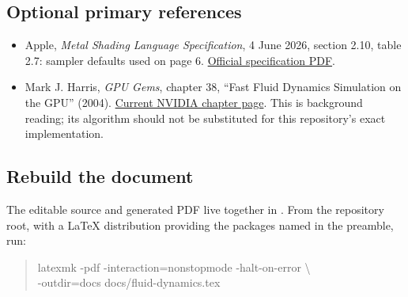 \documentclass[11pt,a4paper]{article}
\begin{document}
\subsection*{Optional primary references}
\begin{itemize}
\item Apple, \emph{Metal Shading Language Specification}, 4 June 2026,
section 2.10, table 2.7: sampler defaults used on page 6.
\href{https://developer.apple.com/metal/Metal-Shading-Language-Specification.pdf}{Official specification PDF}.
\item Mark J. Harris, \emph{GPU Gems}, chapter 38, ``Fast Fluid Dynamics
Simulation on the GPU'' (2004).
\href{https://developer.nvidia.com/gpugems/gpugems/part-vi-beyond-triangles/chapter-38-fast-fluid-dynamics-simulation-gpu}{Current NVIDIA chapter page}.
This is background reading; its algorithm should not be substituted for this
repository's exact implementation.
\end{itemize}

\subsection*{Rebuild the document}
The editable source and generated PDF live together in .
From the repository root, with a LaTeX distribution providing the packages named
in the preamble, run:
\begin{quote}\small\ttfamily
latexmk -pdf -interaction=nonstopmode -halt-on-error \textbackslash\\
\hspace*{1em}-outdir=docs docs/fluid-dynamics.tex
\end{quote}
\end{document}
